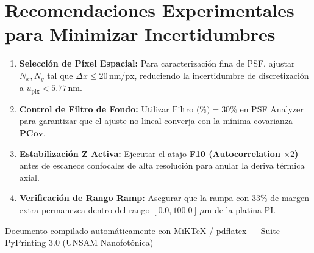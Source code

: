 \documentclass[11pt,a4paper]{article}
\begin{document}
\section{Recomendaciones Experimentales para Minimizar Incertidumbres}

\begin{enumerate}[leftmargin=*]
    \item \textbf{Selección de Píxel Espacial:} Para caracterización fina de PSF, ajustar $N_x, N_y$ tal que $\Delta x \le 20\,\text{nm/px}$, reduciendo la incertidumbre de discretización a $u_{\text{pix}} < 5.77\,\text{nm}$.
    \item \textbf{Control de Filtro de Fondo:} Utilizar $\text{Filtro (\%)} = 30\%$ en PSF Analyzer para garantizar que el ajuste no lineal converja con la mínima covarianza $\mathbf{PCov}$.
    \item \textbf{Estabilización Z Activa:} Ejecutar el atajo \textbf{F10 (Autocorrelation $\times 2$)} antes de escaneos confocales de alta resolución para anular la deriva térmica axial.
    \item \textbf{Verificación de Rango Ramp:} Asegurar que la rampa con $33\%$ de margen extra permanezca dentro del rango $[0.0, 100.0]\,\mu\text{m}$ de la platina PI.
\end{enumerate}

\vspace{0.8cm}
\begin{center}
    \small \color{gray}
    Documento compilado automáticamente con MiKTeX / pdflatex --- Suite PyPrinting 3.0 (UNSAM Nanofotónica)
\end{center}
\end{document}
